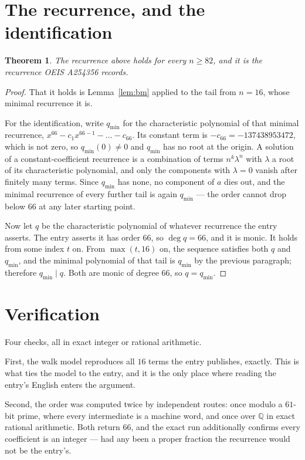 \documentclass[11pt,a4paper]{article}
\theoremstyle{plain}
\newtheorem{theorem}{Theorem}
\theoremstyle{definition}
\begin{document}
\section{The recurrence, and the identification}

\begin{theorem}
The recurrence above holds for every $n\ge82$, and it is the recurrence OEIS A254356 records.
\end{theorem}

\begin{proof}
That it holds is Lemma~\ref{lem:bm} applied to the tail from $n=16$, whose minimal
recurrence it is.

For the identification, write $q_{\min}$ for the characteristic polynomial of that minimal
recurrence, $x^{66}-c_1x^{66-1}-\dots-c_{66}$. Its constant term is
$-c_{66}=-137438953472$, which is not zero, so $q_{\min}(0)\neq0$ and $q_{\min}$ has no
root at the origin. A solution of a constant-coefficient recurrence is a combination of terms
$n^{k}\lambda^{n}$ with $\lambda$ a root of its characteristic polynomial, and only the
components with $\lambda=0$ vanish after finitely many terms. Since $q_{\min}$ has none, no
component of $a$ dies out, and the minimal recurrence of every further tail is again
$q_{\min}$ --- the order cannot drop below $66$ at any later starting point.

Now let $q$ be the characteristic polynomial of whatever recurrence the entry asserts. The
entry asserts it has order $66$, so $\deg q=66$, and it is monic. It holds from some
index $t$ on. From $\max(t,16)$ on, the sequence satisfies both $q$ and $q_{\min}$, and
the minimal polynomial of that tail is $q_{\min}$ by the previous paragraph; therefore
$q_{\min}\mid q$. Both are monic of degree $66$, so $q=q_{\min}$.
\end{proof}

\section{Verification}

Four checks, all in exact integer or rational arithmetic.

First, the walk model reproduces all $16$ terms the entry publishes, exactly. This is
what ties the model to the entry, and it is the only place where reading the entry's English
enters the argument.

Second, the order was computed twice by independent routes: once modulo a $61$-bit prime, where
every intermediate is a machine word, and once over $\mathbb{Q}$ in exact rational arithmetic.
Both return $66$, and the exact run additionally confirms every coefficient is an integer
--- had any been a proper fraction the recurrence would not be the entry's.
\end{document}
